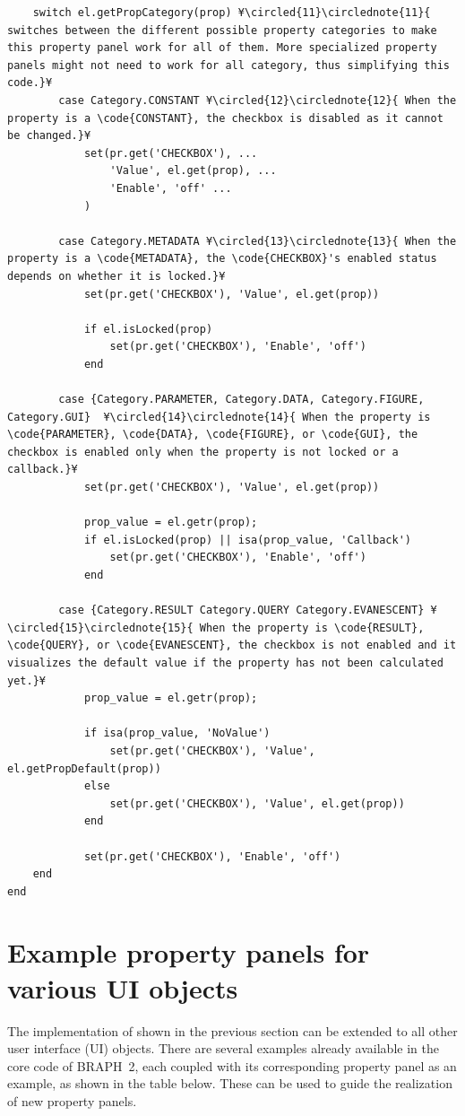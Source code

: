 \documentclass{tufte-handout}
\begin{document}
\begin{lstlisting}
	switch el.getPropCategory(prop) ¥\circled{11}\circlednote{11}{ switches between the different possible property categories to make this property panel work for all of them. More specialized property panels might not need to work for all category, thus simplifying this code.}¥
		case Category.CONSTANT ¥\circled{12}\circlednote{12}{ When the property is a \code{CONSTANT}, the checkbox is disabled as it cannot be changed.}¥
			set(pr.get('CHECKBOX'), ...
				'Value', el.get(prop), ...
				'Enable', 'off' ...
			)

		case Category.METADATA ¥\circled{13}\circlednote{13}{ When the property is a \code{METADATA}, the \code{CHECKBOX}'s enabled status depends on whether it is locked.}¥
			set(pr.get('CHECKBOX'), 'Value', el.get(prop))

			if el.isLocked(prop)
				set(pr.get('CHECKBOX'), 'Enable', 'off')
			end

		case {Category.PARAMETER, Category.DATA, Category.FIGURE, Category.GUI}  ¥\circled{14}\circlednote{14}{ When the property is \code{PARAMETER}, \code{DATA}, \code{FIGURE}, or \code{GUI}, the checkbox is enabled only when the property is not locked or a callback.}¥
			set(pr.get('CHECKBOX'), 'Value', el.get(prop))

			prop_value = el.getr(prop);
			if el.isLocked(prop) || isa(prop_value, 'Callback')
				set(pr.get('CHECKBOX'), 'Enable', 'off')
			end

		case {Category.RESULT Category.QUERY Category.EVANESCENT} ¥\circled{15}\circlednote{15}{ When the property is \code{RESULT}, \code{QUERY}, or \code{EVANESCENT}, the checkbox is not enabled and it visualizes the default value if the property has not been calculated yet.}¥
			prop_value = el.getr(prop);

			if isa(prop_value, 'NoValue')
				set(pr.get('CHECKBOX'), 'Value', el.getPropDefault(prop))
			else
				set(pr.get('CHECKBOX'), 'Value', el.get(prop))
			end

			set(pr.get('CHECKBOX'), 'Enable', 'off')
	end
end
\end{lstlisting}

\clearpage

\section{Example property panels for various UI objects}

The implementation of  shown in the previous section can be extended to all other user interface (UI) objects. There are several examples already available in the core code of BRAPH~2, each coupled with its corresponding property panel as an example, as shown in the table below. These can be used to guide the realization of new property panels.
\end{document}
